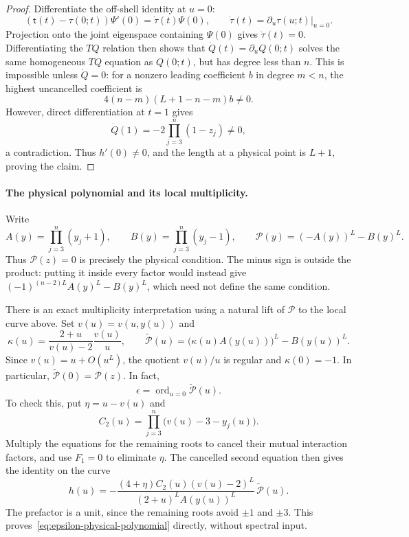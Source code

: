 \documentclass[11pt]{article}
\theoremstyle{definition}
\newcommand{\ord}{\operatorname{ord}}
\begin{document}
\begin{proof}
Differentiate the off-shell identity at $u=0$:
\[
 (\mathsf t(t)-\tau(0;t))\Psi'(0)
       =\dot\tau(t)\Psi(0),\qquad
 \dot\tau(t)=\left.\partial_u\tau(u;t)\right|_{u=0}.
\]
Projection onto the joint eigenspace containing $\Psi(0)$ gives
$\dot\tau(t)=0$. Differentiating the $TQ$ relation then shows that
$\dot Q(t)=\partial_uQ(0;t)$ solves the same homogeneous $TQ$
equation as $Q(0;t)$, but has degree less than $n$. This is
impossible unless $\dot Q=0$: for a nonzero leading coefficient
$b$ in degree $m<n$, the highest uncancelled coefficient is
\[
 4(n-m)(L+1-n-m)b\ne0.
\]
However, direct differentiation at $t=1$ gives
\[
 \dot Q(1)=-2\prod_{j=3}^n(1-z_j)\ne0,
\]
a contradiction. Thus $h'(0)\ne0$, and the length at a physical
point is $L+1$, proving the claim.
\end{proof}

\paragraph{The physical polynomial and its local multiplicity.}
Write
\[
 A(y)=\prod_{j=3}^n(y_j+1),\qquad
 B(y)=\prod_{j=3}^n(y_j-1),\qquad
 \mathcal P(y)=(-A(y))^L-B(y)^L.
\]
Thus $\mathcal P(z)=0$ is precisely the physical condition. The
minus sign is outside the product: putting it inside every factor
would instead give $(-1)^{(n-2)L}A(y)^L-B(y)^L$, which need not
define the same condition.

There is an exact multiplicity interpretation using a natural lift
of $\mathcal P$ to the local curve above. Set $v(u)=v(u,y(u))$ and
\[
 \kappa(u)=\frac{2+u}{v(u)-2}\frac{v(u)}u,\qquad
 \widetilde{\mathcal P}(u)
 =\bigl(\kappa(u)A(y(u))\bigr)^L-B(y(u))^L.
\]
Since $v(u)=u+O(u^L)$, the quotient $v(u)/u$ is regular and
$\kappa(0)=-1$. In particular,
$\widetilde{\mathcal P}(0)=\mathcal P(z)$. In fact,
\begin{equation}\label{eq:epsilon-physical-polynomial}
 \boxed{\epsilon=\ord_{u=0}\widetilde{\mathcal P}(u).}
\end{equation}
To check this, put $\eta=u-v(u)$ and
\[
 C_2(u)=\prod_{j=3}^n\bigl(v(u)-3-y_j(u)\bigr).
\]
Multiply the equations for the remaining roots to cancel their mutual
interaction factors, and use $F_1=0$ to eliminate $\eta$. The
cancelled second equation then gives the identity on the curve
\[
 h(u)=-\frac{(4+\eta)C_2(u)(v(u)-2)^L}
                  {(2+u)^L A(y(u))^L}\,
                  \widetilde{\mathcal P}(u).
\]
The prefactor is a unit, since the remaining roots avoid $\pm1$
and $\pm3$. This proves~\eqref{eq:epsilon-physical-polynomial}
directly, without spectral input.
\end{document}
